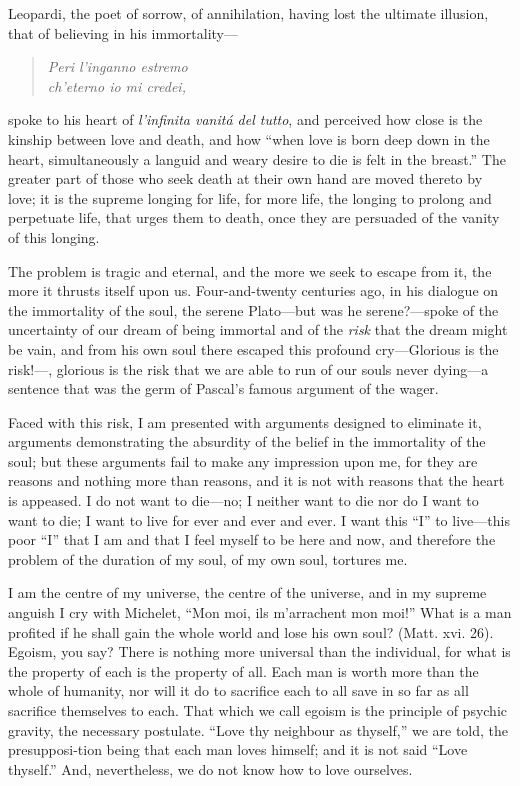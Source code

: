Leopardi, the poet of sorrow, of annihilation, having lost the
ultimate illusion, that of believing in his immortality---

\begin{verse}
\hspace{1.1em}\textit{Peri l'inganno estremo}\\
\textit{ch'eterno io mi credei,}
\end{verse}

\noindent spoke to his heart of \textit{l'infinita vanit\'a del
tutto}, and perceived how close is the kinship between love and death,
and how ``when love is born deep down in the heart, simultaneously a
languid and weary desire to die is felt in the breast.'' The greater
part of those who seek death at their own hand are moved thereto by
love; it is the supreme longing for life, for more life, the longing
 to prolong and perpetuate life, that urges them to death,
once they are persuaded of the vanity of this longing.

The problem is tragic and eternal, and the more we seek to escape from
it, the more it thrusts itself upon us. Four-and-twenty centuries ago,
in his dialogue on the immortality of the soul, the serene
Pla\-to---but was he serene?---spoke of the uncertainty of our dream
of being immortal and of the \textit{risk} that the dream might be
vain, and from his own soul there escaped this profound cry---Glorious
is the risk!---, glorious is the risk that
we are able to run of our souls never dy\-ing---a sentence that was
the germ of Pascal's famous argument of the wager.

Faced with this risk, I am presented with arguments designed to
eliminate it, arguments demonstrating the absurdity of the belief in
the immortality of the soul; but these arguments fail to make any
impression upon me, for they are reasons and nothing more than
reasons, and it is not with reasons that the heart is appeased. I do
not want to die---no; I neither want to die nor do I want to want to
die; I want to live for ever and ever and ever. I want this ``I'' to
live---this poor ``I'' that I am and that I feel myself to be here and
now, and therefore the problem of the duration of my soul, of my own
soul, tortures me.

I am the centre of my universe, the centre of the universe, and in my
supreme anguish I cry with Michelet, ``Mon moi, ils m'arrachent mon
moi!'' What is a man profited if he shall gain the whole world and
lose his own soul? (Matt. xvi. 26). Egoism, you say? There is nothing
more universal than the individual, for what is the property of each
is the property of all. Each man is worth more than the whole of
humanity, nor will it do to sacrifice each to all save in so far as
all sacrifice themselves to each. That which we call egoism is the
principle of psychic gravity, the necessary postulate. ``Love thy
neighbour as thyself,'' we are told, the presupposi-tion
being that each man loves himself; and it is not said ``Love
thyself.'' And, nevertheless, we do not know how to love ourselves.

